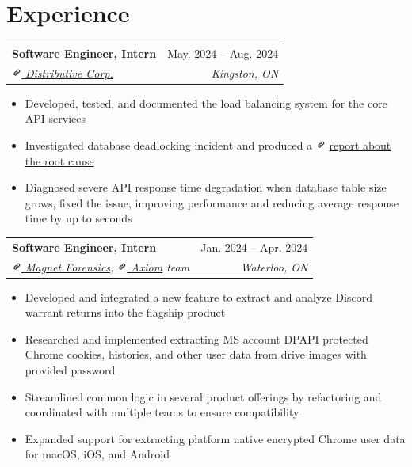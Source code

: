 \documentclass[letterpaper, 10pt]{report}
\makeatletter
\newcommand{\resumeSubheading}[4]{
    \begin{tabular*}{\textwidth}[t]{l@{\extracolsep{\fill}}r}
        \textbf{#1}       & #2                \\
        \textit{\small#3} & \textit{\small#4} \\
    \end{tabular*}\vspace{-0.7em}
}
\newenvironment{ResumeItem}{
    \vspace{-0.3em}
    \begin{itemize}
        \setlength\itemsep{-0.3em}
        }{
    \end{itemize}\vspace{-0.3em}}
\newcommand{\linkIcon}{\includegraphics[height=9pt, trim=0 5cm 0 -1.5cm]{./img/link-icon}}
\makeatother
\begin{document}
\section{Experience}
\resumeSubheading
{Software Engineer, Intern}{May. 2024 -- Aug. 2024}
{\href{https://distributive.network/}{\linkIcon{} Distributive Corp.}}{Kingston, ON}
\begin{ResumeItem}
    \item{Developed, tested, and documented the load balancing system for the core API services}
    \item{Investigated database deadlocking incident and produced a \linkIcon{}
        \href{https://internal-compiler-error.com/mysql-read-commited-gap-lock.html}{report about the root cause}
    }
    \item{Diagnosed severe API response time degradation when database table size grows, fixed the issue, improving performance and reducing average response time by up to seconds}
\end{ResumeItem}

\resumeSubheading
{Software Engineer, Intern}{Jan. 2024 -- Apr. 2024}
{\href{https://www.magnetforensics.com/}{\linkIcon{} Magnet Forensics}, \href{https://www.magnetforensics.com/products/magnet-axiom/}{\linkIcon{} Axiom} team}{Waterloo, ON}
\begin{ResumeItem}
    \item{Developed and integrated a new feature to extract and analyze Discord warrant returns into the flagship product}
    \item{Researched and implemented extracting MS account DPAPI protected Chrome cookies, histories, and other user data from drive images with provided password}
    \item{Streamlined common logic in several product offerings by refactoring and coordinated with multiple teams to ensure compatibility}
    \item{Expanded support for extracting platform native encrypted Chrome user data for macOS, iOS, and Android}
\end{ResumeItem}

\end{document}
